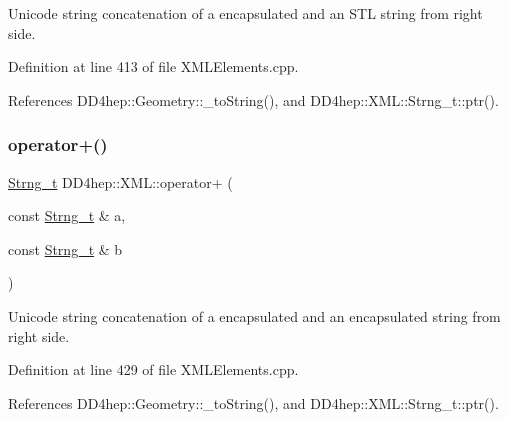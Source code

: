 Unicode string concatenation of a encapsulated and an S\+TL string from right side. 



Definition at line 413 of file X\+M\+L\+Elements.\+cpp.



References D\+D4hep\+::\+Geometry\+::\+\_\+to\+String(), and D\+D4hep\+::\+X\+M\+L\+::\+Strng\+\_\+t\+::ptr().

\hypertarget{group___d_d4_h_e_p___x_m_l_ga16907b7f06827dc354d29834328834f8}{}\label{group___d_d4_h_e_p___x_m_l_ga16907b7f06827dc354d29834328834f8} 
\subsubsection{\texorpdfstring{operator+()}{operator+()}\hspace{0.1cm}{\footnotesize\ttfamily [3/14]}}
{\footnotesize\ttfamily \hyperlink{class_d_d4hep_1_1_x_m_l_1_1_strng__t}{Strng\+\_\+t} D\+D4hep\+::\+X\+M\+L\+::operator+ (\begin{DoxyParamCaption}\item[{const \hyperlink{class_d_d4hep_1_1_x_m_l_1_1_strng__t}{Strng\+\_\+t} \&}]{a,  }\item[{const \hyperlink{class_d_d4hep_1_1_x_m_l_1_1_strng__t}{Strng\+\_\+t} \&}]{b }\end{DoxyParamCaption})}



Unicode string concatenation of a encapsulated and an encapsulated string from right side. 



Definition at line 429 of file X\+M\+L\+Elements.\+cpp.



References D\+D4hep\+::\+Geometry\+::\+\_\+to\+String(), and D\+D4hep\+::\+X\+M\+L\+::\+Strng\+\_\+t\+::ptr().

\hypertarget{group___d_d4_h_e_p___x_m_l_gad9d4f784bd934ca00c54efe28b42c7d2}{}\label{group___d_d4_h_e_p___x_m_l_gad9d4f784bd934ca00c54efe28b42c7d2} 
